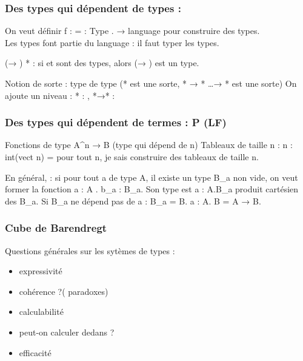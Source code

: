 \documentclass[10pt,a4paper]{article}
\begin{document}
\subsubsection{Des types qui dépendent de types : \lambda \undeline{\omega}}
On veut définir f : = \lambda \alpha : Type . \alpha → \alpha language pour construire des types.\\
Les types font partie du language : il faut typer les types.

\alpha * \beta * \vdash (\alpha → \beta) * : si \alpha et \beta sont des types, alors (\alpha → \beta) est un type.

Notion de sorte : type de type (* est une sorte, * → * \dots → * est une sorte)
On ajoute un niveau : * : \box, *→* : \box

\subsubsection{Des types qui dépendent de termes : \lambda P (LF)}
Fonctions de type A^n → B (type qui dépend de n)
Tableaux de taille n : \Pi n : int(vect n) = pour tout n, je sais construire des tableaux de taille n.

En général, : si pour tout a de type A, il existe un type B_a non vide, on veut former la fonction \lambda a : A . b_a : B_a. Son type est \Pi a : A.B_a produit cartésien des B_a.
Si B_a ne dépend pas de a : B_a = B.   \Pi a : A. B = A → B.

\subsubsection{Cube de Barendregt}

Questions générales sur les sytèmes de types : 
\begin{itemize}
 \item expressivité
 \item cohérence ?( paradoxes)
 \item calculabilité
 \item peut-on calculer dedans ?
 \item efficacité
\end{itemize}
\end{document}

